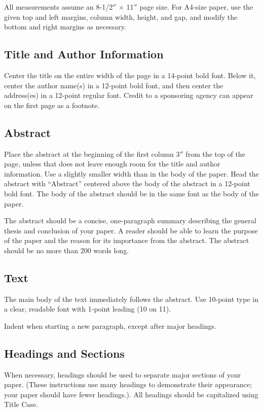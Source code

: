 \documentclass{article}
\begin{document}
All measurements assume an 8-1/2$''$ $\times$ 11$''$ page size. For
A4-size paper, use the given top and left margins, column width,
height, and gap, and modify the bottom and right margins as necessary.


\subsection{Title and Author Information}

Center the title on the entire width of the page in a 14-point bold
font. Below it, center the author name(s) in a 12-point bold font, and
then center the address(es) in a 12-point regular font. Credit to a
sponsoring agency can appear on the first page as a footnote.


\subsection{Abstract}

Place the abstract at the beginning of the first column 3$''$ from the
top of the page, unless that does not leave enough room for the title
and author information. Use a slightly smaller width than in the body
of the paper. Head the abstract with ``Abstract'' centered above the
body of the abstract in a 12-point bold font. The body of the abstract
should be in the same font as the body of the paper.

The abstract should be a concise, one-paragraph summary describing the
general thesis and conclusion of your paper. A reader should be able
to learn the purpose of the paper and the reason for its importance
from the abstract. The abstract should be no more than 200 words long.

\subsection{Text}

The main body of the text immediately follows the abstract. Use
10-point type in a clear, readable font with 1-point leading (10 on
11).

Indent when starting a new paragraph, except after major headings.

\subsection{Headings and Sections}

When necessary, headings should be used to separate major sections of
your paper. (These instructions use many headings to demonstrate their
appearance; your paper should have fewer headings.). All headings should be capitalized using Title Case.
\end{document}
